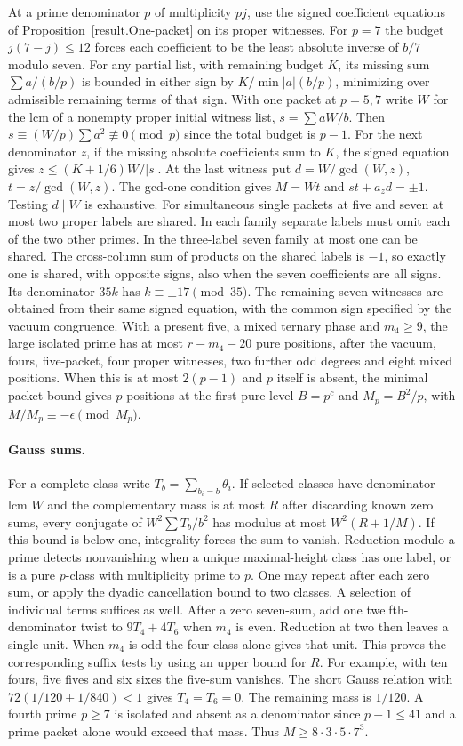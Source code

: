\documentclass[11pt]{amsart}
\numberwithin{equation}{section}
\theoremstyle{definition}
\theoremstyle{plain}
\begin{document}
At a prime denominator $p$ of multiplicity $pj$, use the signed
coefficient equations of Proposition~\ref{result.One-packet} on its proper
witnesses. For $p=7$ the budget
$j(7-j)\le12$ forces each coefficient to be the least absolute
inverse of $b/7$ modulo seven. For any partial list, with remaining
budget $K$, its missing sum $\sum a/(b/p)$ is bounded in either
sign by $K/\min |a|(b/p)$, minimizing over admissible remaining
terms of that sign. With one packet at $p=5,7$ write $W$ for the
lcm of a nonempty proper initial witness list, $s=\sum aW/b$.
Then $s\equiv (W/p)\sum a^2\not\equiv0\pmod p$ since the total
budget is $p-1$. For the next denominator $z$, if the missing
absolute coefficients sum to $K$, the signed equation gives
$z\le(K+1/6)W/|s|$. At the last witness put $d=W/\gcd(W,z)$,
$t=z/\gcd(W,z)$. The gcd-one condition gives $M=Wt$ and
$st+a_zd=\pm1$. Testing $d\mid W$ is exhaustive.
For simultaneous single packets at five and seven at most two proper
labels are shared. In each family separate labels must omit each of
the two other primes. In the three-label seven family at most one
can be shared. The cross-column sum of products on the shared
labels is $-1$, so exactly one is shared, with opposite signs,
also when the seven coefficients are all signs. Its denominator
$35k$ has $k\equiv\pm17\pmod{35}$. The remaining seven witnesses
are obtained from their same signed equation, with the common sign
specified by the vacuum congruence. With a present five, a mixed
ternary phase and $m_4\ge9$, the large isolated prime has at most
$r-m_4-20$ pure positions, after the vacuum, fours, five-packet,
four proper witnesses, two further odd degrees and eight mixed positions.
When this is at most $2(p-1)$ and $p$ itself is absent, the minimal
packet bound gives $p$ positions at the first pure level $B=p^c$ and
$M_p=B^2/p$, with $M/M_p\equiv-\epsilon\pmod{M_p}$.

\paragraph{Gauss sums.}
For a complete class write $T_b=\sum_{b_i=b}\theta_i$.
If selected classes have denominator lcm $W$ and the complementary
mass is at most $R$ after discarding known zero sums, every conjugate
of $W^2\sum T_b/b^2$ has modulus at most $W^2(R+1/M)$.
If this bound is below one, integrality forces the sum to vanish. Reduction modulo
a prime detects nonvanishing when a unique maximal-height class has
one label, or is a pure $p$-class with multiplicity prime to $p$.
One may repeat after each zero sum, or apply the dyadic cancellation
bound to two classes. A selection of individual terms suffices as well. After
a zero seven-sum, add one twelfth-denominator twist to $9T_4+4T_6$
when $m_4$ is even. Reduction at two then leaves a single unit.
When $m_4$ is odd the four-class alone gives that unit. This proves the corresponding suffix tests by
using an upper bound for $R$. For example, with ten fours, five fives
and six sixes the five-sum vanishes. The short Gauss relation with
$72(1/120+1/840)<1$ gives $T_4=T_6=0$. The remaining mass is
$1/120$. A fourth prime $p\ge7$ is isolated and absent as a denominator
since $p-1\le41$ and a prime packet alone would exceed that mass.
Thus $M\ge8\cdot3\cdot5\cdot7^3$.
\end{document}
